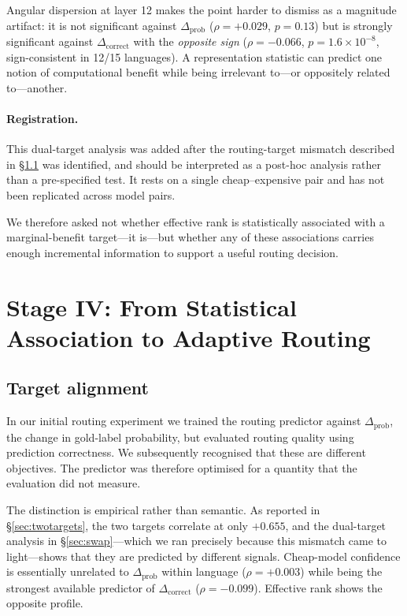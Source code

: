 \documentclass[11pt]{article}
\newcommand{\claim}[1]{#1}   %
\begin{document}
Angular dispersion at layer 12 makes the point harder to dismiss as a magnitude
artifact: it is not significant against $\Delta_{\mathrm{prob}}$
($\rho = +0.029$, $p = 0.13$) but is strongly significant against
$\Delta_{\mathrm{correct}}$ with the \emph{opposite sign}
($\rho = -0.066$, $p = 1.6 \times 10^{-8}$, sign-consistent in 12/15 languages).
\claim{A representation statistic can predict one notion of computational
benefit while being irrelevant to---or oppositely related to---another.}

\paragraph{Registration.} \claim{This dual-target analysis was added after the
routing-target mismatch described in \S\ref{sec:targetalign} was identified, and
should be interpreted as a post-hoc analysis rather than a pre-specified test.}
It rests on a single cheap--expensive pair and has not been replicated across
model pairs.

We therefore asked not whether effective rank is statistically associated with
a marginal-benefit target---it is---but whether any of these associations carries
enough incremental information to support a useful routing decision.

\section{Stage IV: From Statistical Association to Adaptive Routing}
\label{sec:f4}

\subsection{Target alignment}
\label{sec:targetalign}

In our initial routing experiment we trained the routing predictor against
$\Delta_{\mathrm{prob}}$, the change in gold-label probability, but evaluated
routing quality using prediction correctness. We subsequently recognised that
these are different objectives. The predictor was therefore optimised for a
quantity that the evaluation did not measure.

The distinction is empirical rather than semantic. As reported in
\S\ref{sec:twotargets}, the two targets correlate at only $+0.655$, and the
dual-target analysis in \S\ref{sec:swap}---which we ran precisely because this
mismatch came to light---shows that they are predicted by different signals.
Cheap-model confidence is essentially unrelated to $\Delta_{\mathrm{prob}}$
within language ($\rho = +0.003$) while being the strongest available predictor
of $\Delta_{\mathrm{correct}}$ ($\rho = -0.099$). Effective rank shows the
opposite profile.
\end{document}
